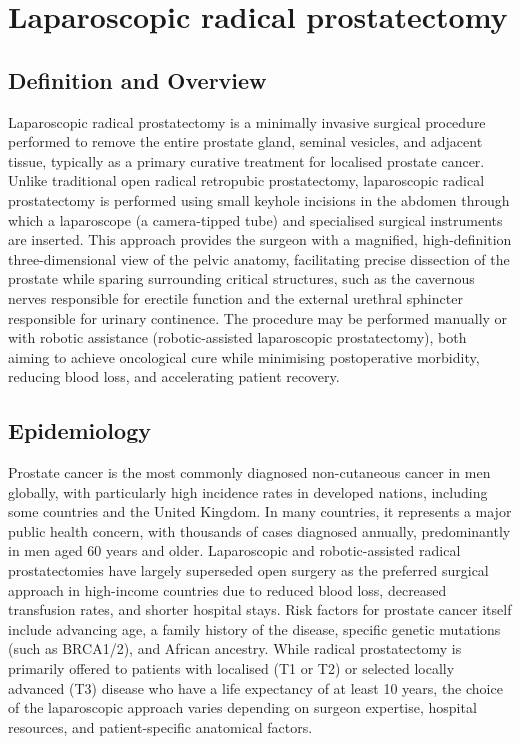 \chapter{Laparoscopic radical prostatectomy}

\section*{Definition and Overview}
Laparoscopic radical prostatectomy is a minimally invasive surgical procedure performed to remove the entire prostate gland, seminal vesicles, and adjacent tissue, typically as a primary curative treatment for localised prostate cancer. Unlike traditional open radical retropubic prostatectomy, laparoscopic radical prostatectomy is performed using small keyhole incisions in the abdomen through which a laparoscope (a camera-tipped tube) and specialised surgical instruments are inserted. This approach provides the surgeon with a magnified, high-definition three-dimensional view of the pelvic anatomy, facilitating precise dissection of the prostate while sparing surrounding critical structures, such as the cavernous nerves responsible for erectile function and the external urethral sphincter responsible for urinary continence. The procedure may be performed manually or with robotic assistance (robotic-assisted laparoscopic prostatectomy), both aiming to achieve oncological cure while minimising postoperative morbidity, reducing blood loss, and accelerating patient recovery.

\section*{Epidemiology}
Prostate cancer is the most commonly diagnosed non-cutaneous cancer in men globally, with particularly high incidence rates in developed nations, including some countries and the United Kingdom. In many countries, it represents a major public health concern, with thousands of cases diagnosed annually, predominantly in men aged 60 years and older. Laparoscopic and robotic-assisted radical prostatectomies have largely superseded open surgery as the preferred surgical approach in high-income countries due to reduced blood loss, decreased transfusion rates, and shorter hospital stays. Risk factors for prostate cancer itself include advancing age, a family history of the disease, specific genetic mutations (such as BRCA1/2), and African ancestry. While radical prostatectomy is primarily offered to patients with localised (T1 or T2) or selected locally advanced (T3) disease who have a life expectancy of at least 10 years, the choice of the laparoscopic approach varies depending on surgeon expertise, hospital resources, and patient-specific anatomical factors.

